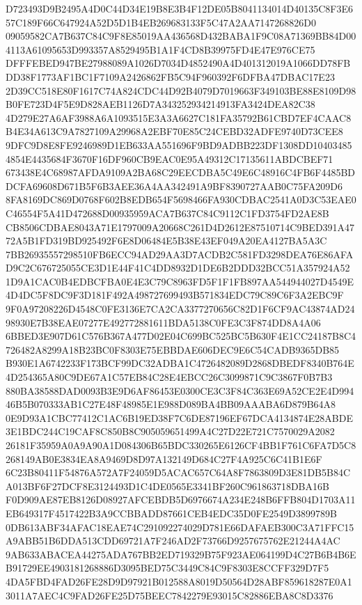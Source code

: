\documentclass[UTF8,fontset=fandol,zihao=-4,a4paper]{ctexart}
\begin{document}
{{D723493D9B2495A4D0C44D34E19B8E3B4F12DE05B8041134014D40135C8F3E657C189F66C647924A52D5D1B4EB269683133F5C47A2AA7147268826D0
09059582CA7B637C84C9F8E85019AA436568D432BABA1F9C08A71369BB84D004113A61095653D993357A8529495B1A1F4CD8B39975FD4E47E976CE75
DFFFEBED947BE27988089A1026D7034D4852490A4D401312019A1066DD78FBDD38F1773AF1BC1F7109A2426862FB5C94F960392F6DFBA47DBAC17E23
2D39CC518E80F1617C74A824CDC44D92B4079D7019663F349103BE88E8109D98B0FE723D4F5E9D828AEB1126D7A343252934214913FA3424DEA82C38
4D279E27A6AF3988A6A1093515E3A3A6627C181FA35792B61CBD7EF4CAAC8B4E34A613C9A7827109A29968A2EBF70E85C24CEBD32ADFE9740D73CEE8
9DFC9D8E8FE9246989D1EB633AA551696F9BD9ADBB223DF1308DD104034854854E4435684F3670F16DF960CB9EAC0E95A49312C17135611ABDCBEF71
673438E4C68987AFDA9109A2BA68C29EECDBA5C49E6C48916C4FB6F4485BDDCFA69608D671B5F6B3AEE36A4AA342491A9BF8390727AAB0C75FA209D6
8FA8169DC869D0768F602B8EDB654F5698466FA930CDBAC2541A0D3C53EAE0C46554F5A41D472688D00935959ACA7B637C84C9112C1FD3754FD2AE8B
CB8506CDBAE8043A71E1797009A20668C261D4D2612E87510714C9BED391A4772A5B1FD319BD925492F6E8D06484E5B38E43EF049A20EA4127BA5A3C
7BB26935557298510FB6ECC94AD29AA3D7ACDB2C581FD3298DEA76E86AFAD9C2C676725055CE3D1E44F41C4DD8932D1DE6B2DDD32BCC51A357924A52
1D9A1CAC0B4EDBCFBA0E4E3C79C8963FD5F1F1FB897AA544944027D4549E4D4DC5F8DC9F3D181F492A498727699493B571834EDC79C89C6F3A2EBC9F
9F0A97208226D4548C0FE3136E7CA2CA3377270656C82D1F6CF9AC43874AD2498930E7B38EAE07277E492772881611BDA5138C0FE3C3F874DD8A4A06
6BBED3E907D61C576B367A477D02E04C699BC525BC5B630F4E1CC24187B8C4726482A8299A18B23BC0F8303E75EBBDAE606DEC9E6C54CADB9365DB85
B930E1A6742233F173BCF99DC32ADBA1C4726482089D2868DBEDF8340B764E4D254365A80C9DE67A1C57EB84C28E4EBCC26C3099871C9C3867F0B7B3
880BA38588DAD0093B3E9D6AF86453E0300CE3C3F84C363E69A52CE2E4D99446B5B070333AB1C27E48F48985E1E988D089BA4BB09AAABA6D879B64A8
0E9D93A1CBC77412C1AC6B19ED38F7C6DE87196EF67DCA4134874E28ABDE3E1BDC244C19CAF8C850B8C905059651499A4C27D22E721C7570029A2082
26181F35959A0A9A90A1D084306B65BDC330265E6126CF4BB1F761C6FA7D5C8268149AB0E3834EA8A9469D8D97A132149D684C27F4A925C6C41B1E6F
6C23B80411F54876A572A7F24059D5ACAC657C64A8F7863809D3E81DB5B84CA013BF6F27DCF8E3124493D1C4DE0565E3341BF260C961863718DBA16B
F0D909AE87EB8126D08927AFCEBDB5D6976674A234E248B6FFB804D1703A11EB649317F4517422B3A9CCBBADD87661CEB4EDC35D0FE2549D3899789B
0DB613ABF34AFAC18EAE74C291092274029D781E66DAFAEB300C3A71FFC15A9ABB51B6DDA513CDD69721A7F246AD2F73766D9257675762E21244A4AC
9AB633ABACEA44275ADA767BB2ED719329B75F923AE064199D4C27B6B4B6EB91729EE4903181268886D3095BED75C3449C84C9F8303E8CCFF329D7F5
4DA5FBD4FAD26FE28D9D97921B012588A8019D50564D28ABF859618287E0A13011A7AEC4C9FAD26FE25D75BEEC7842279E93015C82886EBA8C8D3376
}}
\end{document}
